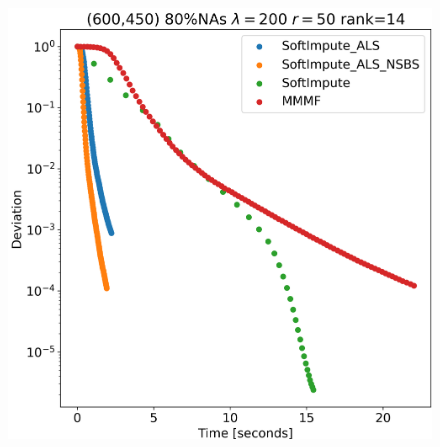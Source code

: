 \documentclass[11pt]{article}
\begin{document}
\begin{figure}[ht!]
{\begin{minipage}{6.6cm}
			\includegraphics[scale=0.35]{timing_experiment_case2.png}        
	\end{minipage}}
\end{figure}
\end{document}
